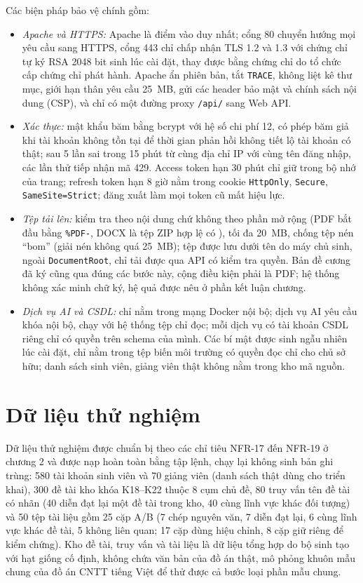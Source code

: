 \documentclass[../main.tex]{subfiles}
\begin{document}
Các biện pháp bảo vệ chính gồm:
\begin{itemize}
    \item \textit{Apache và HTTPS:} Apache là điểm vào duy nhất; cổng 80 chuyển hướng mọi yêu cầu sang HTTPS, cổng 443 chỉ chấp nhận TLS 1.2 và 1.3 với chứng chỉ tự ký RSA 2048 bit sinh lúc cài đặt, thay được bằng chứng chỉ do tổ chức cấp chứng chỉ phát hành. Apache ẩn phiên bản, tắt \texttt{TRACE}, không liệt kê thư mục, giới hạn thân yêu cầu 25~MB, gửi các header bảo mật và chính sách nội dung (CSP), và chỉ có một đường proxy \texttt{/api/} sang Web API.
    \item \textit{Xác thực:} mật khẩu băm bằng bcrypt với hệ số chi phí 12, có phép băm giả khi tài khoản không tồn tại để thời gian phản hồi không tiết lộ tài khoản có thật; sau 5 lần sai trong 15 phút từ cùng địa chỉ IP với cùng tên đăng nhập, các lần thử tiếp nhận mã 429. Access token hạn 30 phút chỉ giữ trong bộ nhớ của trang; refresh token hạn 8 giờ nằm trong cookie \texttt{HttpOnly}, \texttt{Secure}, \texttt{SameSite=Strict}; đăng xuất làm mọi token cũ mất hiệu lực.
    \item \textit{Tệp tải lên:} kiểm tra theo nội dung chứ không theo phần mở rộng (PDF bắt đầu bằng \texttt{\%PDF-}, DOCX là tệp ZIP hợp lệ có ), tối đa 20~MB, chống tệp nén ``bom'' (giải nén không quá 25~MB); tệp được lưu dưới tên do máy chủ sinh, ngoài \texttt{DocumentRoot}, chỉ tải được qua API có kiểm tra quyền. Bản đề cương đã ký cũng qua đúng các bước này, cộng điều kiện phải là PDF; hệ thống không xác minh chữ ký, hệ quả được nêu ở phần kết luận chương.
    \item \textit{Dịch vụ AI và CSDL:} chỉ nằm trong mạng Docker nội bộ; dịch vụ AI yêu cầu khóa nội bộ, chạy với hệ thống tệp chỉ đọc; mỗi dịch vụ có tài khoản CSDL riêng chỉ có quyền trên schema của mình. Các bí mật được sinh ngẫu nhiên lúc cài đặt, chỉ nằm trong tệp biến môi trường có quyền đọc chỉ cho chủ sở hữu; danh sách sinh viên, giảng viên thật không nằm trong kho mã nguồn.
\end{itemize}

\section{Dữ liệu thử nghiệm}\label{sec:c4-du-lieu}

Dữ liệu thử nghiệm được chuẩn bị theo các chỉ tiêu NFR-17 đến NFR-19 ở chương 2 và được nạp hoàn toàn bằng tập lệnh, chạy lại không sinh bản ghi trùng: 580 tài khoản sinh viên và 70 giảng viên (danh sách thật dùng cho triển khai), 300 đề tài kho khóa K18--K22 thuộc 8 cụm chủ đề, 80 truy vấn tên đề tài có nhãn (40 diễn đạt lại một đề tài trong kho, 40 cùng lĩnh vực khác đối tượng) và 50 tệp tài liệu gồm 25 cặp A/B (7 chép nguyên văn, 7 diễn đạt lại, 6 cùng lĩnh vực khác đề tài, 5 không liên quan; 17 cặp dùng hiệu chỉnh, 8 cặp giữ riêng để kiểm chứng). Kho đề tài, truy vấn và tài liệu là dữ liệu tổng hợp do bộ sinh  tạo với hạt giống cố định, không chứa văn bản của đồ án thật, mô phỏng khuôn mẫu chung của đồ án CNTT tiếng Việt để thử được cả bước loại phần mẫu chung.
\end{document}

